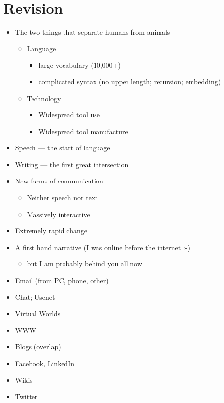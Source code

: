\documentclass[a4paper,landscape,headrule,footrule,xetex]{foils}
\begin{document}
\section{Revision}



\begin{itemize}
\item The two things that separate humans from animals \citep[\S1.1]{Sproat:2010}
  \begin{itemize}
  \item Language
    \begin{itemize}
    \item large vocabulary (10,000+)
    \item complicated syntax (no upper length; recursion; embedding)
    \end{itemize}

  \item Technology
    \begin{itemize}
    \item Widespread tool use
    \item Widespread tool manufacture
    \end{itemize}
  \end{itemize}
\item Speech --- the start of language 
\item Writing --- the first great intersection
\end{itemize}



\begin{itemize}
\item New forms of communication
  \begin{itemize}
  \item Neither speech nor text
  \item Massively interactive
  \end{itemize}
\item Extremely rapid change
\item A first hand narrative (I was online before the internet :-)
  \begin{itemize}
  \item but I am probably behind you all now
  \end{itemize}
\end{itemize}


\begin{itemize} 
\item Email (from PC, phone, other)
\item Chat; Usenet
\item Virtual Worlds
\item WWW
\item Blogs (overlap)
\item Facebook, LinkedIn
\item Wikis
\item Twitter
\end{itemize}
\end{document}
